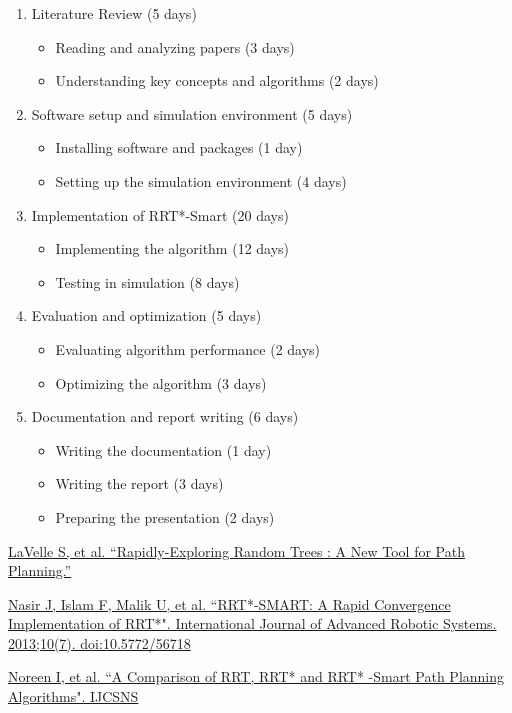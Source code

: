 \documentclass[12pt]{extarticle}
\begin{document}
\begin{enumerate}
	\item Literature Review (5 days)
	\begin{itemize}
		\item Reading and analyzing papers (3 days)
		\item Understanding key concepts and algorithms (2 days)
	\end{itemize}
	
	\item Software setup and simulation environment (5 days)
	\begin{itemize}
		\item Installing software and packages (1 day)
		\item Setting up the simulation environment (4 days)
	\end{itemize}
	
	\item Implementation of RRT*-Smart (20 days)
	\begin{itemize}
		\item Implementing the algorithm (12 days)
		\item Testing in simulation (8 days)
	\end{itemize}

	\item Evaluation and optimization (5 days)
	\begin{itemize}
		\item Evaluating algorithm performance (2 days)
		\item Optimizing the algorithm (3 days)
	\end{itemize}

	\item Documentation and report writing (6 days)
	\begin{itemize}
		\item Writing the documentation (1 day)
		\item Writing the report (3 days)
		\item Preparing the presentation (2 days)
	\end{itemize}
\end{enumerate}
\newpage
\begin{thebibliography}{9}
	\href{http://lavalle.pl/papers/Lav98c.pdf}{LaVelle S, et al. ``Rapidly-Exploring Random Trees : A New Tool for Path Planning.”}

	\href{https://journals.sagepub.com/doi/10.5772/56718}{Nasir J, Islam F, Malik U, et al. ``RRT*-SMART: A Rapid Convergence Implementation of RRT*". International Journal of Advanced Robotic Systems. 2013;10(7). doi:10.5772/56718}
	
	\href{http://paper.ijcsns.org/07_book/201610/20161004.pdf}{Noreen I, et al. ``A Comparison of RRT, RRT* and RRT* -Smart Path Planning Algorithms". IJCSNS}
\end{thebibliography}
\end{document}
